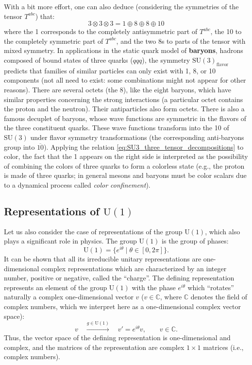 \begin{example}
    With a bit more effort, one can also deduce (considering the symmetries of the tensor \(T^{abc}\)) that:
    \begin{equation}
        3 \otimes 3 \otimes 3 = 1 \oplus 8 \oplus 8 \oplus 10
        \label{eq:SU3_three_tensor_decompositions}
    \end{equation}
    where the 1 corresponds to the completely antisymmetric part of \(T^{abc}\), the 10 to the completely symmetric part of \(T^{abc}\), and the two 8s to parts of the tensor with mixed symmetry. In applications in the static quark model of \textbf{baryons}, hadrons composed of bound states of three quarks (\(qqq\)), the symmetry \(\mathrm{SU}(3)_{\text{flavor}}\) predicts that families of similar particles can only exist with 1, 8, or 10 components (not all need to exist: some combinations might not appear for other reasons). There are several octets (the 8), like the eight baryons, which have similar properties concerning the strong interactions (a particular octet contains the proton and the neutron). Their antiparticles also form octets. There is also a famous decuplet of baryons, whose wave functions are symmetric in the flavors of the three constituent quarks. These wave functions transform into the 10 of \(\mathrm{SU}(3)\) under flavor symmetry transformations (the corresponding anti-baryons group into \(\overline{10}\)). Applying the relation \eqref{eq:SU3_three_tensor_decompositions} to color, the fact that the 1 appears on the right side is interpreted as the possibility of combining the colors of three quarks to form a colorless state (e.g., the proton is made of three quarks; in general mesons and baryons must be color scalars due to a dynamical process called \textit{color confinement}).
\end{example}

\subsection{Representations of \texorpdfstring{$\mathrm{U}(1)$}{U(1)}}

Let us also consider the case of representations of the group \(\mathrm{U}(1)\), which also plays a significant role in physics. The group \(\mathrm{U}(1)\) is the group of phases:
\[
    \mathrm{U}(1) = \{e^{i\theta} \mid \theta \in [0, 2\pi]\}.
\]
It can be shown that all its irreducible unitary representations are one-dimensional complex representations which are characterized by an integer number, positive or negative, called the ``charge''. The defining representation represents an element of the group \(\mathrm{U}(1)\) with the phase \(e^{i\theta}\) which ``rotates'' naturally a complex one-dimensional vector \(v\) (\(v \in \mathbb{C}\), where \(\mathbb{C}\) denotes the field of complex numbers, which we interpret here as a one-dimensional complex vector space):
\[
    v \quad \xrightarrow{g \in \mathrm{U}(1)} \quad v' = e^{i\theta} v, \qquad v \in \mathbb{C}.
\]
Thus, the vector space of the defining representation is one-dimensional and complex, and the matrices of the representation are complex \(1 \times 1\) matrices (i.e., complex numbers).


